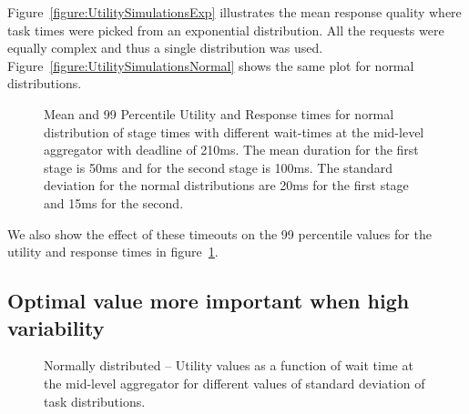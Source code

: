 \documentclass[letterpaper,twocolumn,10pt]{article}
\begin{document}
Figure~\ref{figure:UtilitySimulationsExp} illustrates the mean response quality where task times were picked from an exponential distribution. All the requests were equally complex and thus a single distribution was used. Figure~\ref{figure:UtilitySimulationsNormal} shows the same plot for normal distributions.

\begin{figure}[!t]
\centering
{}
\vspace{0.1in}
\caption{Mean and 99 Percentile Utility and Response times for normal distribution of stage times with different wait-times at the mid-level aggregator with deadline of 210ms. The mean duration for the first stage is 50ms and for the second stage is 100ms. The standard deviation for the normal distributions are 20ms for the first stage and 15ms for the second.}
\label{figure:SimulationsNormal}
\end{figure}

We also show the effect of these timeouts on the 99 percentile values for the utility and response times in figure~\ref{figure:SimulationsNormal}.


\subsection{Optimal value more important when high variability}
\begin{figure}[!t]
\centering
{}
\vspace{0.1in}
\caption{Normally distributed -- Utility values as a function of wait time at the mid-level aggregator for different values of standard deviation of task distributions.}
\label{figure:OptimalWrtStdevNormal}
\end{figure}
\end{document}
